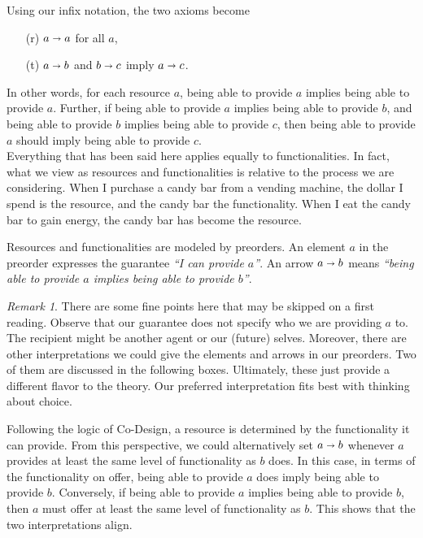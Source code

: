 \documentclass[12pt]{article}
\theoremstyle{definition}
\theoremstyle{plain}
\theoremstyle{plain}
\theoremstyle{plain}
\theoremstyle{plain}
\theoremstyle{remark}
\theoremstyle{remark}
\newtheorem{remark}[definition]{Remark}
\begin{document}
Using our infix notation, the two axioms become 
\begin{itemize}
	\item[(r)] $a \shortrightarrow a$ for all $a$,
	\item[(t)] $a \shortrightarrow b$ and $b \shortrightarrow c$ imply $a \shortrightarrow c$.
\end{itemize}  
In other words, for each resource $a$, being able to provide $a$ implies being able to provide $a$. Further, if being able to provide $a$ implies being able to provide $b$, and being able to provide $b$ implies being able to provide $c$, then being able to provide $a$ should imply being able to provide $c$. \\

Everything that has been said here applies equally to functionalities. In fact, what we view as resources and functionalities is relative to the process we are considering. When I purchase a candy bar from a vending machine, the dollar I spend is the resource, and the candy bar the functionality. When I eat the candy bar to gain energy, the candy bar has become the resource.

\begin{tcolorbox}[title=Resources and Functionalities, colframe=Apricot, colback = paleorange, coltitle = Sepia]
	Resources and functionalities are modeled by preorders. An element $a$ in the preorder expresses the guarantee \emph{``I can provide $a$''}. An arrow $a \shortrightarrow b$ means \emph{``being able to provide $a$ implies being able to provide $b$''}. 
\end{tcolorbox}

\begin{remark}
	There are some fine points here that may be skipped on a first reading. Observe that our guarantee does not specify who we are providing $a$ to. The recipient might be another agent or our (future) selves. Moreover, there are other interpretations we could give the elements and arrows in our preorders. Two of them are discussed in the following boxes. Ultimately, these just provide a different flavor to the theory. Our preferred interpretation fits best with thinking about choice.
\end{remark}

\begin{tcolorbox}[title= Functionality Interpretation]
	 Following the logic of Co-Design, a resource is determined by the functionality it can provide. From this perspective, we could alternatively set $a \shortrightarrow b$ whenever $a$ provides at least the same level of functionality as $b$ does. In this case, in terms of the functionality on offer, being able to provide $a$ does imply being able to provide $b$. Conversely, if being able to provide $a$ implies being able to provide $b$, then $a$ must offer at least the same level of functionality as $b$. This shows that the two interpretations align.
\end{tcolorbox}
\end{document}

